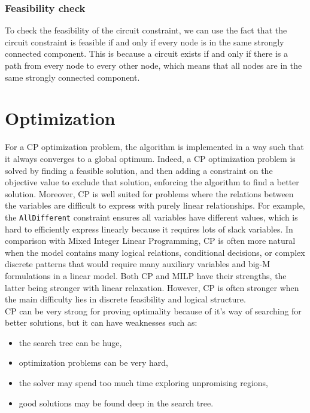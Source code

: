 \documentclass[12pt, openany]{report}
\theoremstyle{definition}
\begin{document}
\subsection{Feasibility check}
To check the feasibility of the circuit constraint, we can use the fact that the circuit constraint is feasible if and only if every node is in the same strongly connected component. This is because a circuit exists if and only if there is a path from every node to every other node, which means that all nodes are in the same strongly connected component.
\chapter{Optimization}
For a CP optimization problem, the algorithm is implemented in a way such that it always converges to a global optimum. Indeed, a CP optimization problem is solved by finding a feasible solution, and then adding a constraint on the objective value to exclude that solution, enforcing the algorithm to find a better solution. Moreover, CP is well suited for problems where the relations between the variables are difficult to express with purely linear relationships. For example, the \texttt{AllDifferent} constraint ensures all variables have different values, which is hard to efficiently express linearly because it requires lots of slack variables. In comparison with Mixed Integer Linear Programming, CP is often more natural when the model contains many logical relations, conditional decisions, or complex discrete patterns that would require many auxiliary variables and big-M formulations in a linear model. Both CP and MILP have their strengths, the latter being stronger with linear relaxation. However, CP is often stronger when the main difficulty lies in discrete feasibility and logical structure.\\
CP can be very strong for proving optimality because of it's way of searching for better solutions, but it can have weaknesses such as:
\begin{itemize}
    \item the search tree can be huge,
    \item optimization problems can be very hard,
    \item the solver may spend too much time exploring unpromising regions,
    \item good solutions may be found deep in the search tree.
\end{itemize}
\end{document}
